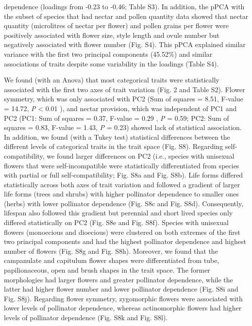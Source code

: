 \documentclass[
  12pt,
  a4paper,
]{article}
\begin{document}
dependence (loadings from -0.23 to -0.46; Table S3). In addition, the pPCA with the subset of species that had nectar and pollen quantity data showed that nectar quantity (microlitres of nectar per flower) and pollen grains per flower were positively associated with flower size, style length and ovule number but negatively associated with flower number (Fig. S4). This pPCA explained similar variance with the first two principal components (45.52\%) and similar associations of traits despite some variability in the loadings (Table S4).

We found (with an Anova) that most categorical traits were statistically associated with the first two axes of trait variation (Fig. 2 and Table S2). Flower symmetry, which was only associated with PC2 (Sum of squares = 8.51, F-value = 14.72, \emph{P} \textless{} 0.01 ), and nectar provision, which was independent of PC1 and PC2 (PC1: Sum of squares = 0.37, F-value = 0.29 , \emph{P} = 0.59; PC2: Sum of squares = 0.83, F-value = 1.43, \emph{P} = 0.23) showed lack of statistical association. In addition, we found (with a Tukey test) statistical differences between the different levels of categorical traits in the trait space (Fig. S8). Regarding self-compatibility, we found larger differences on PC2 (i.e., species with unisexual flowers that were self-incompatible were statistically differentiated from species with partial or full self-compatibility; Fig. S8a and Fig. S8b). Life forms differed statistically across both axes of trait variation and followed a gradient of larger life forms (trees and shrubs) with higher pollinator dependence to smaller ones (herbs) with lower pollinator dependence (Fig. S8c and Fig. S8d). Consequently, lifespan also followed this gradient but perennial and short lived species only differed statistically on PC2 (Fig. S8e and Fig. S8f). Species with unisexual flowers (monoecious and dioecious) were clustered on both extremes of the first two principal components and had the highest pollinator dependence and highest number of flowers (Fig. S8g and Fig. S8h). Moreover, we found that the campanulate and capitulum flower shapes were differentiated from tube, papilionaceous, open and brush shapes in the trait space. The former morphologies had larger flowers and greater pollinator dependence, while the latter had higher flower number and lower pollinator dependence (Fig. S8i and Fig. S8j). Regarding flower symmetry, zygomorphic flowers were associated with lower levels of pollinator dependence, whereas actinomorphic flowers had higher levels of pollinator dependence (Fig. S8k and Fig. S8l).
\end{document}
